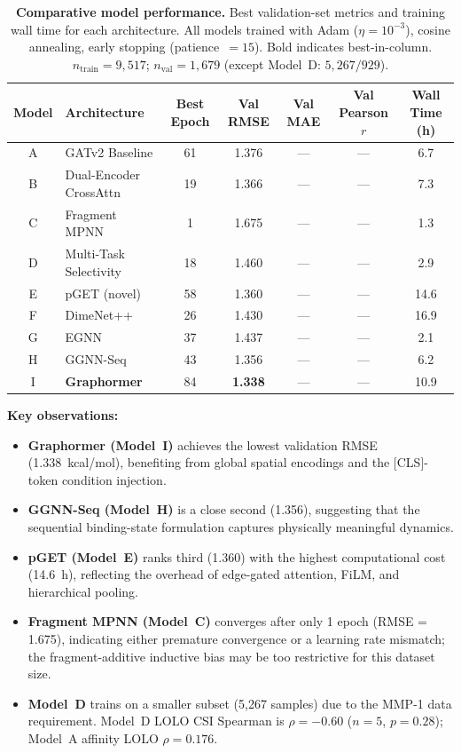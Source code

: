 \documentclass[11pt]{article}
\begin{document}
\begin{table}[H]
\small
\centering
\caption{\textbf{Comparative model performance.}
  Best validation-set metrics and training wall time for each architecture.
  All models trained with Adam ($\eta = 10^{-3}$), cosine annealing,
  early stopping (patience~$=15$). Bold indicates best-in-column.
  $n_{\mathrm{train}} = 9{,}517$; $n_{\mathrm{val}} = 1{,}679$
  (except Model~D: $5{,}267 / 929$).}
\label{tab:app_final_metrics}
\begin{tabular}{clccccc}
\toprule
\textbf{Model} & \textbf{Architecture} & \textbf{Best Epoch}
  & \textbf{Val RMSE} & \textbf{Val MAE}
  & \textbf{Val Pearson $r$} & \textbf{Wall Time (h)} \\
\midrule
A & GATv2 Baseline         &  61 & 1.376 & ---  & --- &  6.7 \\
B & Dual-Encoder CrossAttn &  19 & 1.366 & ---  & --- &  7.3 \\
C & Fragment MPNN          &   1 & 1.675 & ---  & --- &  1.3 \\
D & Multi-Task Selectivity &  18 & 1.460 & ---  & --- &  2.9 \\
E & pGET (novel)           &  58 & 1.360 & ---  & --- & 14.6 \\
F & DimeNet++              &  26 & 1.430 & ---  & --- & 16.9 \\
G & EGNN                   &  37 & 1.437 & ---  & --- &  2.1 \\
H & GGNN-Seq               &  43 & 1.356 & ---  & --- &  6.2 \\
I & \textbf{Graphormer}    &  84 & \textbf{1.338} & --- & --- & 10.9 \\
\bottomrule
\end{tabular}
\end{table}

\noindent
\textbf{Key observations:}
\begin{itemize}[leftmargin=1.5em]
  \item \textbf{Graphormer (Model~I)} achieves the lowest validation RMSE
    (1.338~kcal/mol), benefiting from global spatial encodings and the
    [CLS]-token condition injection.
  \item \textbf{GGNN-Seq (Model~H)} is a close second (1.356), suggesting
    that the sequential binding-state formulation captures physically
    meaningful dynamics.
  \item \textbf{pGET (Model~E)} ranks third (1.360) with the highest
    computational cost (14.6~h), reflecting the overhead of edge-gated
    attention, FiLM, and hierarchical pooling.
  \item \textbf{Fragment MPNN (Model~C)} converges after only 1 epoch
    (RMSE = 1.675), indicating either premature convergence or a learning
    rate mismatch; the fragment-additive inductive bias may be too
    restrictive for this dataset size.
  \item \textbf{Model~D} trains on a smaller subset (5,267 samples) due
    to the MMP-1 data requirement. Model~D LOLO CSI Spearman is
    $\rho = -0.60$ ($n{=}5$, $p{=}0.28$); Model~A affinity LOLO
    $\rho = 0.176$.
\end{itemize}
\end{document}
